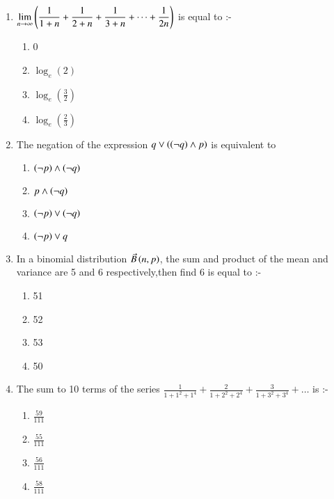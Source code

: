 \documentclass[journal]{IEEEtran}
\begin{document}
\begin{enumerate}
	\item $\displaystyle \lim_{n \to \infty} \left( \frac{1}{1+n} + \frac{1}{2+n} + \frac{1}{3+n} + \cdots +\frac{1}{2n} \right)$ is equal to :-
\begin{multicols}{2}
\begin{enumerate}
    \item 0
    \item $\log_e(2)$
    \item $\log_e(\frac{3}{2})$
    \item $\log_e(\frac{2}{3})$
\end{enumerate}
\end{multicols}
\item The negation of the expression $q \vee \left(\left(\neg q\right)\wedge p\right)$ is equivalent to 
\begin{multicols}{2}
\begin{enumerate}
\item $\left(\neg p\right) \wedge \left(\neg q\right)$
\item $p \wedge \left(\neg q\right)$
\item $\left(\neg p\right) \vee \left(\neg q\right)$
\item $\left(\neg p\right) \vee q$
\end{enumerate}
\end{multicols}
\item In a binomial distribution $\Vec{B}\left(n,p\right)$, the sum and product of the mean and variance are 5 and 6 respectively,then find 6 is equal to :-
\begin{multicols}{2}
\begin{enumerate}
    \item 51
    \item 52
    \item 53
    \item 50
\end{enumerate}
\end{multicols}
\item The sum to 10 terms of the series $\frac{1}{1+1^2+1^4}+\frac{2}{1+2^2+2^4}+\frac{3}{1+3^2+3^4}+ \dots$ is :-
\begin{multicols}{2}
\begin{enumerate}
    \item $\frac{59}{111}$
    \item $\frac{55}{111}$
    \item $\frac{56}{111}$
    \item $\frac{58}{111}$
\end{enumerate}

\end{multicols}
\end{enumerate}
\end{document}
